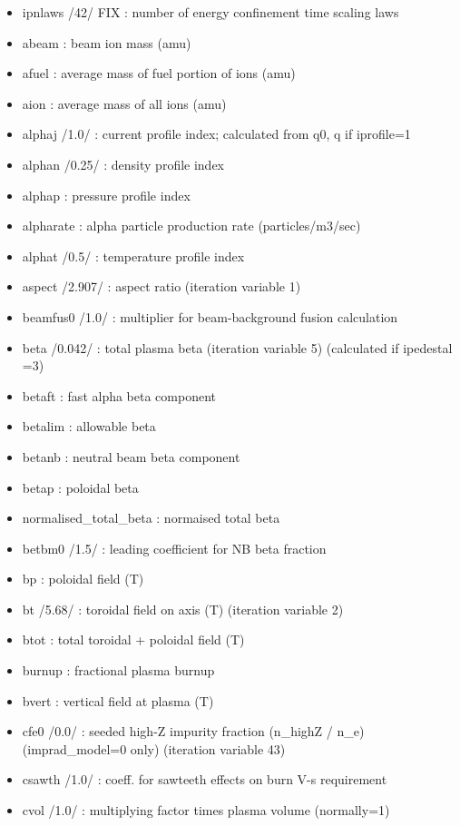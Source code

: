 \documentclass[]{article}
\providecommand{\tightlist}{%
  \setlength{\itemsep}{0pt}\setlength{\parskip}{0pt}}
\begin{document}
\begin{itemize}
\tightlist
\item
  ipnlaws /42/ FIX : number of energy confinement time scaling laws
\item
  abeam : beam ion mass (amu)
\item
  afuel : average mass of fuel portion of ions (amu)
\item
  aion : average mass of all ions (amu)
\item
  alphaj /1.0/ : current profile index; calculated from q0, q if
  iprofile=1
\item
  alphan /0.25/ : density profile index
\item
  alphap : pressure profile index
\item
  alpharate : alpha particle production rate (particles/m3/sec)
\item
  alphat /0.5/ : temperature profile index
\item
  aspect /2.907/ : aspect ratio (iteration variable 1)
\item
  beamfus0 /1.0/ : multiplier for beam-background fusion calculation
\item
  beta /0.042/ : total plasma beta (iteration variable 5) (calculated if
  ipedestal =3)
\item
  betaft : fast alpha beta component
\item
  betalim : allowable beta
\item
  betanb : neutral beam beta component
\item
  betap : poloidal beta
\item
  normalised\_total\_beta : normaised total beta
\item
  betbm0 /1.5/ : leading coefficient for NB beta fraction
\item
  bp : poloidal field (T)
\item
  bt /5.68/ : toroidal field on axis (T) (iteration variable 2)
\item
  btot : total toroidal + poloidal field (T)
\item
  burnup : fractional plasma burnup
\item
  bvert : vertical field at plasma (T)
\item
  cfe0 /0.0/ : seeded high-Z impurity fraction (n\_highZ / n\_e)
  (imprad\_model=0 only) (iteration variable 43)
\item
  csawth /1.0/ : coeff. for sawteeth effects on burn V-s requirement
\item
  cvol /1.0/ : multiplying factor times plasma volume (normally=1)

\end{itemize}
\end{document}
